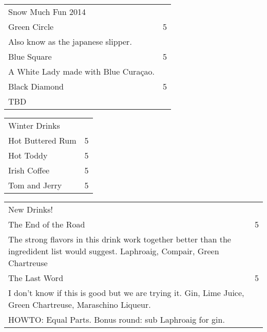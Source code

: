 \documentclass[12pt]{article}
\makeatletter
\newcommand*\ColText[1]{\textcolor{Goldenrod3}{#1}}
\newenvironment{Group}[1]
  {\noindent\begin{tabular*}{\textwidth}{@{}p{.8\linewidth}@{\extracolsep{\fill}}r@{}}
    {\fontsize{24}{29}\selectfont\ColText{#1}}\\[0.8em]}
  {\end{tabular*}}
\newcommand*\Entry[1]{%
  \sffamily#1 & 5}
\newcommand*\Expl[1]{
  \hspace*{1em}\footnotesize #1}
\newcommand*\HowTo[1]{
  HOWTO: \hspace*{1em}\footnotesize #1
}
\makeatother
\begin{document}
\begin{Group}{Snow Much Fun 2014}

\Entry{Green Circle} \\
\Expl{Also know as the japanese slipper.} \\

\Entry{Blue Square} \\
\Expl{A White Lady made with Blue Curaçao.} \\

\Entry{Black Diamond} \\
\Expl{TBD} \\

\end{Group}

\vfill

\begin{Group}{Winter Drinks}
\Entry{Hot Buttered Rum} \\
\Entry{Hot Toddy} \\
\Entry{Irish Coffee} \\
\Entry{Tom and Jerry} \\
\end{Group}

\vfill

\begin{Group}{New Drinks!}

\Entry{The End of the Road} \\
\Expl{The strong flavors in this drink work together better than the ingredident list would suggest. Laphroaig, Compair, Green Chartreuse} \\

\Entry{The Last Word} \\
\Expl{I don't know if this is good but we are trying it. Gin, Lime Juice, Green Chartreuse, Maraschino Liqueur.} \\
\HowTo{Equal Parts. Bonus round: sub Laphroaig for gin.} \\

\end{Group}

\vfill
\end{document}
